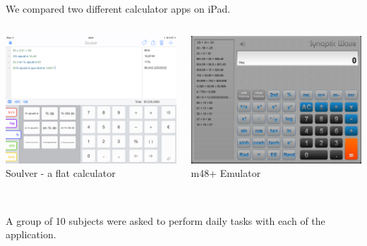 \documentclass{beamer}
\begin{document}
\begin{frame}
We compared two different calculator apps on iPad.

\begin{columns}[c]
        \begin{center}
        \includegraphics[height=.75\textwidth]{soulveur-screen.png}\\
        Soulver - a flat calculator
        \end{center}
       \begin{center}
        \includegraphics[height=.75\textwidth]{m38-screen.png}\\
        m48+ Emulator
        \end{center}
    \end{columns}

    ~\\

    A group of 10 subjects were asked to perform daily tasks with each of the application.

\end{frame}
\end{document}
